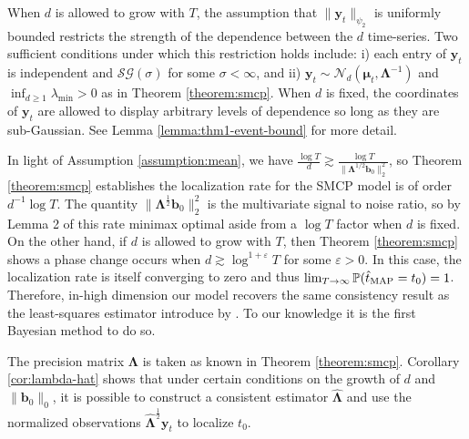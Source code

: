 \begin{remark}\label{rmk:sub-g}
    When $d$ is allowed to grow with $T$, the assumption that $\lVert \mathbf{y}_t\rVert_{\psi_2}$ is uniformly bounded restricts the strength of the dependence between the $d$ time-series. Two sufficient conditions under which this restriction holds include: i) each entry of $\mathbf{y}_t$ is independent and $\mathcal{SG}(\sigma)$ for some $\sigma < \infty$, and ii) $\mathbf{y}_t \sim \mathcal{N}_d(\boldsymbol{\mu}_t, \boldsymbol{\Lambda}^{-1})$ and $\inf_{d\geq 1}  \lambda_{\min} > 0$ as in Theorem \ref{theorem:smcp}. When $d$ is fixed, the coordinates of $\mathbf{y}_t$ are allowed to display arbitrary levels of dependence so long as they are sub-Gaussian. See Lemma \ref{lemma:thm1-event-bound} for more detail.
\end{remark}
\vspace{-10pt}

In light of Assumption \ref{assumption:mean}, we have $\frac{\log T}{d} \gtrsim \frac{\log T}{\lVert\boldsymbol{\Lambda}^{1/2}\mathbf{b}_0\rVert_2^2}$, so Theorem \ref{theorem:smcp} establishes the localization rate for the SMCP model is of order $d^{-1} \log T$. The quantity $\lVert \boldsymbol{\Lambda}^{\frac{1}{2}} \mathbf{b}_0\rVert_2^2$ is the multivariate signal to noise ratio, so by Lemma 2 of \cite{Wang2020_localization} this rate minimax optimal aside from a $\log T$ factor when $d$ is fixed. On the other hand, if $d$ is allowed to grow with $T$, then Theorem \ref{theorem:smcp} shows a phase change occurs when $d\gtrsim \log^{1+\varepsilon}T$ for some $\varepsilon > 0$. In this case, the localization rate is itself converging to zero and thus $\lim_{T\to\infty}\Pr(\hat{t}_{\normalfont \text{MAP}} = t_0) = 1$. Therefore, in-high dimension our model recovers the same consistency result as the least-squares estimator introduce by \cite{Bai10}. To our knowledge it is the first Bayesian method to do so.  

The precision matrix $\boldsymbol{\Lambda}$ is taken as known in Theorem \ref{theorem:smcp}. Corollary \ref{cor:lambda-hat} shows that under certain conditions on the growth of $d$ and $\lVert \mathbf{b}_0\rVert_0$, it is possible to construct a consistent estimator $\hat{\boldsymbol{\Lambda}}$ and use the normalized observations $\hat{\boldsymbol{\Lambda}}^{\frac{1}{2}}\mathbf{y}_t$ to localize $t_0$.

\begin{corollary}
    \label{cor:lambda-hat}
\end{corollary}

